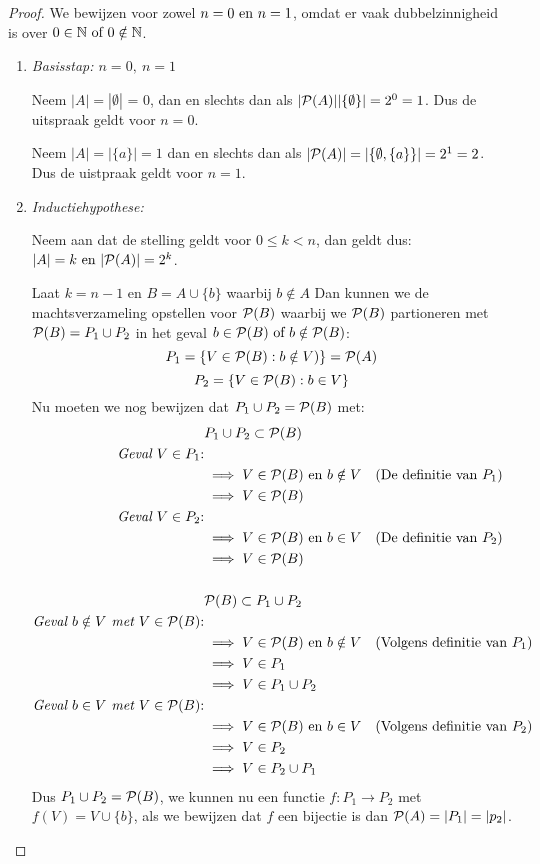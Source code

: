 \documentclass{article}
\begin{document}
\begin{proof}
	We bewijzen voor zowel $n = 0 \text{ en } n = 1$,
	omdat er vaak dubbelzinnigheid is over 
	$0 \in \mathbb{N} \text{ of } 0 \notin \mathbb{N}$.
	\begin{enumerate}
		\item \emph{Basisstap: $n = 0, \ n = 1$}

		      Neem $|A| = |\emptyset|$ = 0,
		      dan en slechts dan als
		      $|\mathcal{P}(A)| |\{\emptyset\}| = 2^0 = 1$.
		      Dus de uitspraak geldt voor $n = 0$.


		      Neem $|A| = |\{a\}| = 1$
		      dan en slechts dan als
		      $|\mathcal{P}(A)| = |\{\emptyset, \{a\}\}| = 2^1 = 2$.
		      Dus de uistpraak geldt voor $n = 1$.
		\item \emph{Inductiehypothese:}

		      Neem aan dat de stelling geldt voor
		      $0 \leq k < n$, dan geldt dus:
		      $|A| = k \text{ en } |\mathcal{P}(A)| = 2^k$.

		      Laat $k = n-1$ en $B = A \cup \{b\}$ waarbij $b \notin A$
		      Dan kunnen we de machtsverzameling opstellen
		      voor $\mathcal{P}(B)$ waarbij we $\mathcal{P}(B)$ partioneren met $\mathcal{P}(B) = P_1 \cup P_2$ in het geval 
			  $b \in \mathcal{P}(B) \text{ of } b \notin \mathcal{P}(B)$:
		      \[P_1 = \{V \in \mathcal{P}(B): b \notin V)\} = \mathcal{P}(A)\]
		      \[ P_2 = \{V \in \mathcal{P}(B): b \in V \} \]
			  Nu moeten we nog bewijzen dat $P_1 \cup P_2 = \mathcal{P}(B)$ met: 
			  \begin{align*}
					& P_1 \cup P_2 \subset \mathcal{P}(B) \\
					\text{\emph{Geval $V \in P_1$}:}& \\
					& \implies V \in \mathcal{P}(B) \text{ en } b \notin V \quad (\text{De definitie van $P_1$}) \\
					& \implies V \in \mathcal{P}(B) \\
					\text{\emph{Geval $V \in P_2$}:}& \\
					& \implies V \in \mathcal{P}(B) \text{ en } b \in V \quad (\text{De definitie van $P_2$}) \\
					& \implies V \in \mathcal{P}(B) \\ \\
					&\mathcal{P}(B) \subset P_1 \cup P_2 \\
					\text{\emph{Geval $b \notin V$ met $V\in \mathcal{P}(B)$}:}& \\
					& \implies V \in \mathcal{P}(B) \text{ en } b \notin V \quad (\text{Volgens definitie van $P_1$}) \\
					& \implies V \in P_1 \\
					& \implies V \in P_1 \cup P_2 \\
					\text{\emph{Geval $b \in V$ met $V\in \mathcal{P}(B)$}:}& \\
					& \implies V \in \mathcal{P}(B) \text{ en } b \in V \quad (\text{Volgens definitie van $P_2$}) \\
					& \implies V \in P_2 \\
					& \implies V \in P_2 \cup P_1
			  \end{align*}
			  Dus $P_1 \cup P_2 = \mathcal{P}(B)$, we kunnen nu een functie $f: P_1 \rightarrow P_2$ met $f(V) = V \cup \{b\}$, 
			  als we bewijzen dat $f$ een bijectie is dan $\mathcal{P}(A) = |P_1| = |p_2|$.


\end{enumerate}
\end{proof}
\end{document}
